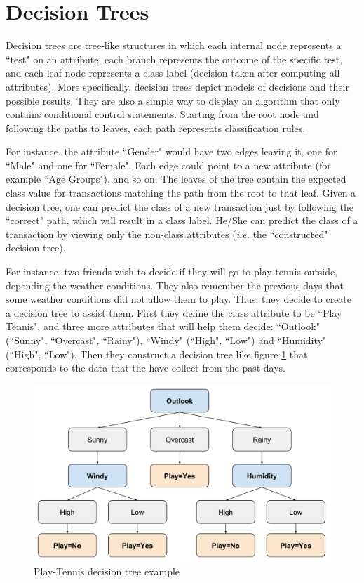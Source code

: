 \newpage
\section{Decision Trees}\label{s:decision-trees}

Decision trees are tree-like structures in which each internal node represents a ``test" on an attribute, each branch represents the outcome of the specific test, and each leaf node represents a class label (decision taken after computing all attributes).
More specifically, decision trees depict models of decisions and their possible results.
They are also a simple way to display an algorithm that only contains conditional control statements.
Starting from the root node and following the paths to leaves, each path represents classification rules.

For instance, the attribute ``Gender" would have two edges leaving it, one for ``Male" and
one for ``Female".
Each edge could point to a new attribute (for example ``Age Groups"), and so on.
The leaves of the tree contain the expected class value for transactions matching the path from the root to that leaf.
Given a decision tree, one can predict the class of a new transaction just by following the ``correct" path, which will result in a class label.
He/She can predict the class of a transaction by viewing only the non-class attributes (\textit{i.e.} the ``constructed" decision tree).

For instance, two friends wish to decide if they will go to play tennis outside, depending the weather conditions.
They also remember the previous days that some weather conditions did not allow them to play.
Thus, they decide to create a decision tree to assist them.
First they define the class attribute to be ``Play Tennis", and three more attributes that will help them decide: ``Outlook" (``Sunny", ``Overcast", ``Rainy"), ``Windy" (``High", ``Low") and ``Humidity" (``High", ``Low").
Then they construct a decision tree like figure \ref{f:outlook} that corresponds to the data that the have collect from the past days.

\begin{figure}[th]
  \centering
  \includegraphics[width=0.8\linewidth]{figures/outlook.pdf}
  \caption{Play-Tennis decision tree example}\label{f:outlook}
\end{figure}

